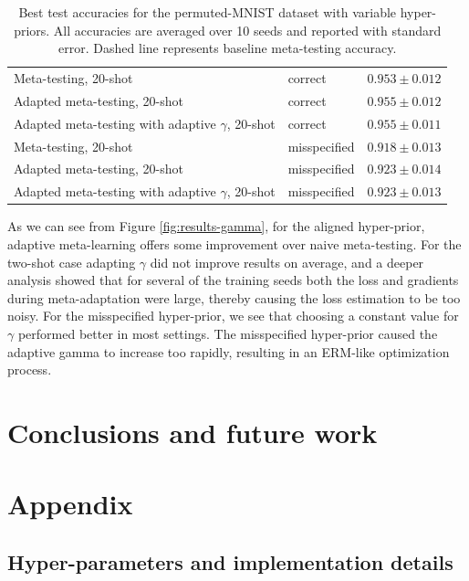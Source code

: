 \documentclass{article}
\theoremstyle{definition}
\begin{document}
\begin{table}
\begin{tabular}{lll}
		Meta-testing, 20-shot & correct   & $0.953\pm 0.012 $      \\
		Adapted meta-testing, 20-shot & correct   & $0.955\pm 0.012$      \\
		Adapted meta-testing with adaptive $\gamma$, 20-shot & correct   & $0.955\pm 0.011$      \\
		\midrule
		Meta-testing, 20-shot & misspecified   & $0.918\pm 0.013 $      \\
		Adapted meta-testing, 20-shot & misspecified   & $0.923\pm 0.014$      \\
		Adapted meta-testing with adaptive $\gamma$, 20-shot & misspecified   & $0.923\pm 0.013$    \\
		\midrule
		\bottomrule
	\end{tabular}
	\caption{Best test accuracies for the permuted-MNIST dataset with variable hyper-priors. All accuracies are averaged over 10 seeds and reported with standard error. Dashed line represents baseline meta-testing accuracy.}
	\label{table:gamma}
\end{table}


As we can see from Figure \ref{fig:results-gamma}, for the aligned hyper-prior, adaptive meta-learning offers some improvement over naive meta-testing. For the two-shot case adapting $\gamma$ did not improve results on average, and a deeper analysis showed that for several of the training seeds both the loss and gradients during meta-adaptation were large, thereby causing the loss estimation to be too noisy. 
For the misspecified hyper-prior, we see that choosing a constant value for $\gamma$ performed better in most settings. The misspecified hyper-prior caused the adaptive gamma to increase too rapidly, resulting in an ERM-like optimization process.

\section{Conclusions and future work}


\clearpage




\appendix
\section{Appendix}

\subsection{Hyper-parameters and implementation details} \label{append:hyper-params}
\end{document}
